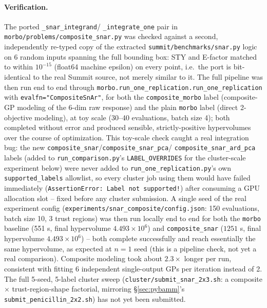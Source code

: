 \documentclass[11pt]{article}
\begin{document}
\paragraph{Verification.} The ported \texttt{\_snar\_integrand}/
\texttt{\_integrate\_one} pair in
\texttt{morbo/\allowbreak problems/\allowbreak composite\_snar.py} was checked against a
second, independently re-typed copy of the extracted
\texttt{summit/benchmarks/snar.py} logic on 6 random inputs spanning
the full bounding box: STY and E-factor matched to within
$10^{-15}$ (float64 machine epsilon) on every point, i.e.\ the port is
bit-identical to the real Summit source, not merely similar to it.
The full pipeline was then run end to end through
\texttt{morbo.run\_one\_replication.\allowbreak run\_one\_replication} with
\texttt{evalfn="CompositeSnAr"}, for both the \texttt{composite\_morbo}
label (composite-GP modeling of the 6-dim raw response) and the plain
\texttt{morbo} label (direct 2-objective modeling), at toy scale
(30--40 evaluations, batch size 4); both completed without error and
produced sensible, strictly-positive hypervolumes over the course of
optimization. This toy-scale check caught a real integration bug: the
new \texttt{composite\_snar}/\texttt{composite\_snar\_pca}/
\texttt{composite\_snar\_ard\_pca} labels (added to
\texttt{run\_comparison.py}'s \texttt{LABEL\_OVERRIDES} for the
cluster-scale experiment below) were never added to
\texttt{run\_one\_replication.py}'s own \texttt{supported\_labels}
allowlist, so every cluster job using them would have failed
immediately (\texttt{AssertionError: Label not supported!}) after
consuming a GPU allocation slot -- fixed before any cluster submission.
A single seed of the real experiment config
(\texttt{experiments/snar\_composite/config.json}: 150 evaluations,
batch size 10, 3 trust regions) was then run locally end to end for
both the \texttt{morbo} baseline (551 s, final hypervolume
$4.493\times10^6$) and \texttt{composite\_snar} ($1251$ s, final
hypervolume $4.493\times10^6$) -- both complete successfully and reach
essentially the same hypervolume, as expected at $n=1$ seed (this is a
pipeline check, not yet a real comparison). Composite modeling took
about $2.3\times$ longer per run, consistent with fitting 6
independent single-output GPs per iteration instead of 2. The full
5-seed, 5-label cluster sweep (\texttt{cluster/submit\_snar\_2x3.sh}: a
composite $\times$ trust-region-shape factorial, mirroring
\S\ref{sec:pybamm}'s \texttt{submit\_penicillin\_2x2.sh}) has not yet
been submitted.
\end{document}
